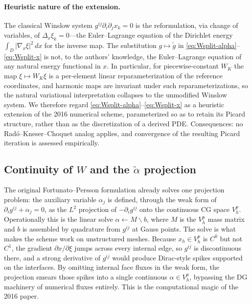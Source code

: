 \documentclass[11pt]{article}
\begin{document}
\paragraph{Heuristic nature of the extension.}\label{sec:W-heuristic}
The classical Winslow system $g^{ij}\partial_i\partial_j x_k = 0$ is
the reformulation, via change of variables, of $\Delta_x \xi_k = 0$---the
Euler--Lagrange equation of the Dirichlet energy $\int_D |\nabla_x \xi|^2\,dx$
for the inverse map. The substitution $g \mapsto \tilde g$ in
\eqref{eq:Wsplit-alpha}--\eqref{eq:Wsplit-x} is not, to the authors'
knowledge, the Euler--Lagrange equation of any natural energy
functional in $x$. In particular, for piecewise-constant $W_K$ the
map $\xi \mapsto W_K \xi$ is a per-element linear reparameterization
of the reference coordinates, and harmonic maps are invariant under
such reparameterizations, so the natural variational interpretation
collapses to the unmodified Winslow system. We therefore regard
\eqref{eq:Wsplit-alpha}--\eqref{eq:Wsplit-x} as a heuristic extension
of the 2016 numerical scheme, parameterized so as to retain its
Picard structure, rather than as the discretization of a derived PDE.
Consequences: no Rad\'o--Kneser--Choquet analog applies, and
convergence of the resulting Picard iteration is assessed empirically.

\subsection{Continuity of $W$ and the $\tilde\alpha$ projection}
\label{sec:W-continuity}

The original Fortunato--Persson formulation already solves one
projection problem: the auxiliary variable $\alpha_j$ is defined,
through the weak form of~$\partial_i g^{ij} + \alpha_j = 0$, as the
$L^2$ projection of $-\partial_i g^{ij}$ onto the continuous CG
space $V_h^p$. Operationally this is the linear solve
$\alpha \leftarrow M \backslash b$, where $M$ is the $V_h^p$ mass
matrix and $b$ is assembled by quadrature from $g^{ij}$ at Gauss
points. The solve is what makes the scheme work on unstructured
meshes. Because $x_h \in V_h^p$ is $C^0$ but not $C^1$, the gradient
$\partial x / \partial \xi$ jumps across every internal edge, so
$g^{ij}$ is discontinuous there, and a strong derivative of $g^{ij}$
would produce Dirac-style spikes supported on the interfaces. By
omitting internal face fluxes in the weak form, the projection
smears those spikes into a single continuous $\alpha \in V_h^p$,
bypassing the DG machinery of numerical fluxes entirely. This is
the computational magic of the 2016 paper.
\end{document}
